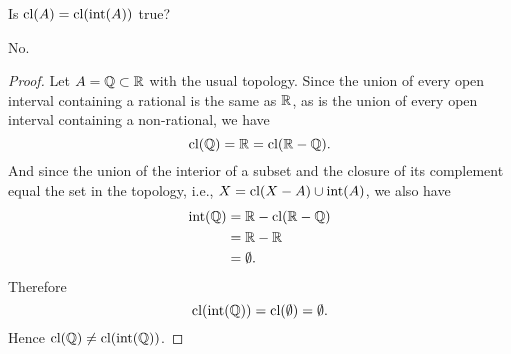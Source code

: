 \setcounter{question}{11} %
\begin{question}[Ewing]
Is $\text{cl}(A)=\text{cl}(\text{int}(A))$ true?
\end{question}
No.
\begin{proof}
Let $A=\mathbb{Q}\subset\mathbb{R}$ with the usual topology. Since the union of every open interval containing a rational is the same as $\mathbb{R}$, as is the union of every open interval containing a non-rational, we have $$\text{cl}(\mathbb{Q})=\mathbb{R}=\text{cl}(\mathbb{R}-\mathbb{Q}).$$ And since the union of the interior of a subset and the closure of its complement equal the set in the topology, i.e., $X=\text{cl}(X-A)\cup\text{int}(A)$, we also have \begin{align*}
\text{int}(\mathbb{Q}) &= \mathbb{R}-\text{cl}(\mathbb{R}-\mathbb{Q})\\
&= \mathbb{R}-\mathbb{R}\\
&= \emptyset.
\end{align*} Therefore $$\text{cl}(\text{int}(\mathbb{Q}))=\text{cl}(\emptyset)=\emptyset.$$
Hence $\text{cl}(\mathbb{Q})\ne\text{cl}(\text{int}(\mathbb{Q}))$.
\end{proof}

